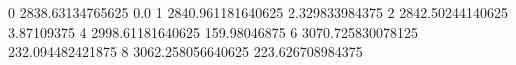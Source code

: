 0 2838.63134765625 0.0
1 2840.961181640625 2.329833984375
2 2842.50244140625 3.87109375
4 2998.61181640625 159.98046875
6 3070.725830078125 232.094482421875
8 3062.258056640625 223.626708984375
